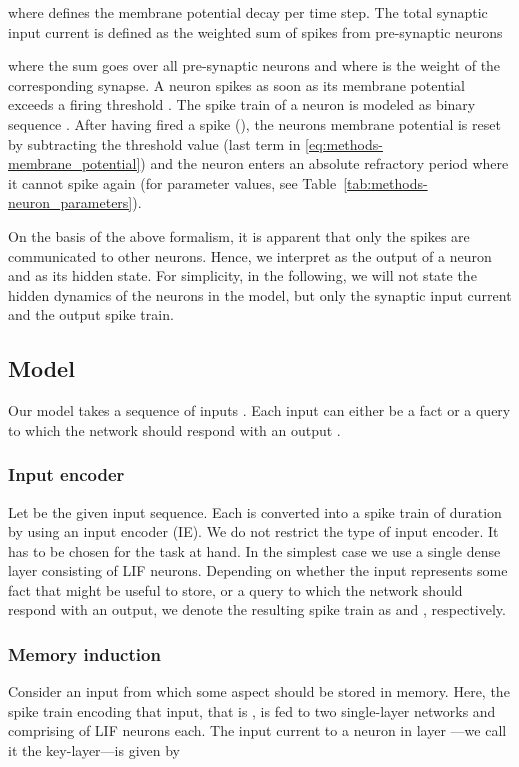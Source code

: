 \documentclass{article}
\begin{document}
where  defines the membrane potential decay per time step. The total synaptic input current  is defined as the weighted sum of spikes from pre-synaptic neurons

where the sum goes over all pre-synaptic neurons  and where  is the weight of the corresponding synapse. A neuron  spikes as soon as its membrane potential  exceeds a firing threshold . The spike train of a neuron  is modeled as binary sequence . After having fired a spike (), the neurons membrane potential is reset by subtracting the threshold value  (last term in \eqref{eq:methods-membrane_potential}) and the neuron enters an absolute refractory period  where it cannot spike again (for parameter values, see Table~\ref{tab:methods-neuron_parameters}).

On the basis of the above formalism, it is apparent that only the spikes are communicated to other neurons. Hence, we interpret  as the output of a neuron  and  as its hidden state. For simplicity, in the following, we will not state the hidden dynamics of the neurons in the model, but only the synaptic input current and the output spike train.

\subsection{Model}
\label{sec:methods-model}
Our model takes a sequence of inputs . Each input  can either be a fact or a query to which the network should respond with an output .


\subsubsection{Input encoder}
Let  be the given input sequence. Each  is converted into a spike train of duration  by using an input encoder (IE). We do not restrict the type of input encoder. It has to be chosen for the task at hand. In the simplest case we use a single dense layer  consisting of  \gls{LIF} neurons.
Depending on whether the input  represents some fact that might be useful to store, or a query to which the network should respond with an output, we denote the resulting spike train as  and , respectively.

\subsubsection{Memory induction}
Consider an input from which some aspect should be stored in memory. Here, the spike train encoding that input, that is , is fed to two single-layer networks  and  comprising of  LIF neurons each. The input current to a neuron  in layer ---we call it the key-layer---is given by
\end{document}

